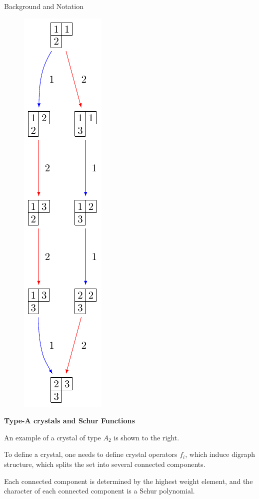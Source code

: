 \documentclass[final]{beamer}
\newlength{\onecolwid}
\newlength{\twocolwid}
\begin{document}
\begin{frame}[t]
\begin{columns}[t]
\begin{column}{\twocolwid}
\begin{columns}[t]
\begin{column}{\onecolwid}
\begin{block}{Background and Notation}
\begin{figure}
\includegraphics[scale=1.6]{Crystal_Young}
\centering
\end{figure}

\textbf{Type-A crystals and Schur Functions}\vskip 10pt

An example of a crystal of type $A_2$ is shown to the right.

To define a crystal, one needs to define crystal operators $f_i$, which induce digraph structure, which splits the set into several connected components.

Each connected component is determined by the highest weight element, and the character of each connected component is a Schur polynomial.
\vskip 15pt


\end{block}
\end{column}
\end{columns}
\end{column}
\end{columns}
\end{frame}
\end{document}
